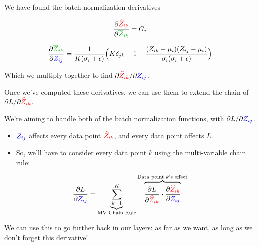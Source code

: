             \begin{kequation}
                We have found the batch normalization derivatives

                \begin{equation*}
                    \pderiv{ \red{\widehat{Z}_{ik}} }{ \grn{\overline{Z}_{ik} } } = G_i
                \end{equation*}

                \begin{equation*}
                    \pderiv{\grn{\overline{Z}_{ik}}}{\blu{Z_{ij}}} =
                    \frac{1}{K(\sigma_i+\epsilon)}
                    \Big( K \delta_{jk} - 1 - \frac{(Z_{ik}-\mu_i)(Z_{ij}-\mu_i)}{\sigma_i(\sigma_i+\epsilon)} \Big)
                \end{equation*}

                Which we multiply together to find ${\partial  \textcolor{red}{\widehat{Z}_{ik}} }/{\partial  \textcolor{blue}{Z_{ij}} }$.
            \end{kequation}

            Once we've computed these derivatives, we can use them to extend the chain of ${\partial L}/{\partial \textcolor{red}{\widehat{Z}_{ik}} }$. 

            We're aiming to handle both of the batch normalization functions, with ${\partial L}/{\partial \textcolor{blue}{Z_{ij}}}$. 

            \begin{itemize}
                \item $\textcolor{blue}{Z_{ij}}$ affects every data point $\textcolor{red}{\widehat{Z}_{ik}}$, and every data point affects $L$.
                \item So, we'll have to consider every data point $k$ using the multi-variable chain rule:
            \end{itemize}
            

            \begin{equation}
                \frac{\partial L}{\partial \textcolor{blue}{Z_{ij}}} = 
                \underbrace{ \sum_{k=1}^K }_{\text{MV Chain Rule}}
                \overbrace{
                    \frac{\partial L}{\partial \textcolor{red}{\widehat{Z}_{ik}} } \cdot 
                    \frac{\partial  \textcolor{red}{\widehat{Z}_{ik}} }{\partial  \textcolor{blue}{Z_{ij}} }
                }^{\text{Data point $k$'s effect}}
            \end{equation}

            We can use this to go further back in our layers: as far as we want, as long as we don't forget this derivative!
            


